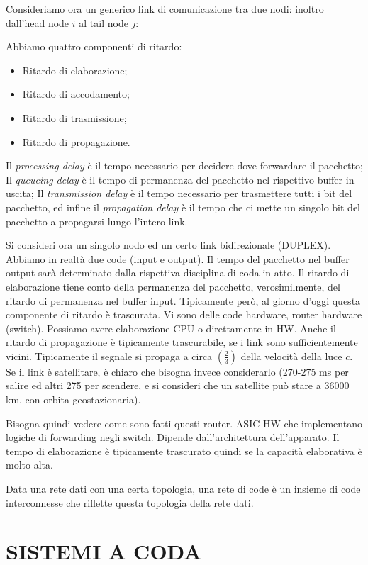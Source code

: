 Consideriamo ora un generico link di comunicazione tra due nodi: inoltro dall'head node $i$ al tail node $j$:

Abbiamo quattro componenti di ritardo:

\begin{itemize}
\item Ritardo di elaborazione;
\item Ritardo di accodamento;
\item Ritardo di trasmissione;
\item Ritardo di propagazione.
\end{itemize}

Il \textit{processing delay} è il tempo necessario per decidere dove forwardare il pacchetto; Il \textit{queueing delay} è il tempo di permanenza del pacchetto nel rispettivo buffer in uscita; Il \textit{transmission delay} è il tempo necessario per trasmettere tutti i bit del pacchetto, ed infine il \textit{propagation delay} è il tempo che ci mette un singolo bit del pacchetto a propagarsi lungo l'intero link.

Si consideri ora un singolo nodo ed un certo link bidirezionale (DUPLEX). Abbiamo in realtà due code (input e output). Il tempo del pacchetto nel buffer output sarà determinato dalla rispettiva disciplina di coda in atto. Il ritardo di elaborazione tiene conto della permanenza del pacchetto, verosimilmente, del ritardo di permanenza nel buffer input. Tipicamente però, al giorno d'oggi questa componente di ritardo è trascurata. Vi sono delle code hardware, router hardware (switch). Possiamo avere elaborazione CPU o direttamente in HW. Anche il ritardo di propagazione è tipicamente trascurabile, se i link sono sufficientemente vicini. Tipicamente il segnale si propaga a circa $(\frac{2}{3})$ della velocità della luce $c$. Se il link è satellitare, è chiaro che bisogna invece considerarlo (270-275 ms per salire ed altri 275 per scendere, e si consideri che un satellite può stare a 36000 km, con orbita geostazionaria).

Bisogna quindi vedere come sono fatti questi router. ASIC HW che implementano logiche di forwarding negli switch. Dipende dall'architettura dell'apparato. Il tempo di elaborazione è tipicamente trascurato quindi se la capacità elaborativa è molto alta.

Data una rete dati con una certa topologia, una rete di code è un insieme di code interconnesse che riflette questa topologia della rete dati. 

\section{SISTEMI A CODA}

